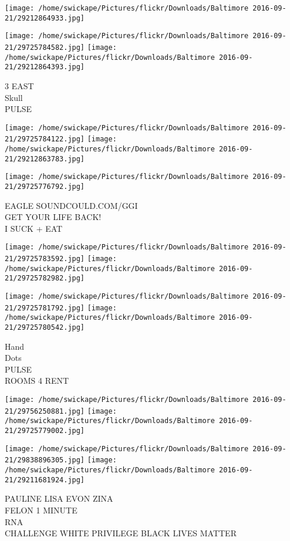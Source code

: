 \documentclass[10pt,letterpaper]{article}
\begin{document}
\texttt{[image: /home/swickape/Pictures/flickr/Downloads/Baltimore 2016-09-21/29212864933.jpg]}

\vspace{0.25in}
\texttt{[image: /home/swickape/Pictures/flickr/Downloads/Baltimore 2016-09-21/29725784582.jpg]}
\texttt{[image: /home/swickape/Pictures/flickr/Downloads/Baltimore 2016-09-21/29212864393.jpg]}

3 EAST\\
Skull\\
PULSE
\pagebreak

\texttt{[image: /home/swickape/Pictures/flickr/Downloads/Baltimore 2016-09-21/29725784122.jpg]}
\texttt{[image: /home/swickape/Pictures/flickr/Downloads/Baltimore 2016-09-21/29212863783.jpg]}

\vspace{0.25in}
\texttt{[image: /home/swickape/Pictures/flickr/Downloads/Baltimore 2016-09-21/29725776792.jpg]}

EAGLE SOUNDCOULD.COM/GGI\\
GET YOUR LIFE BACK!\\
I SUCK + EAT
\pagebreak

\texttt{[image: /home/swickape/Pictures/flickr/Downloads/Baltimore 2016-09-21/29725783592.jpg]}
\texttt{[image: /home/swickape/Pictures/flickr/Downloads/Baltimore 2016-09-21/29725782982.jpg]}

\texttt{[image: /home/swickape/Pictures/flickr/Downloads/Baltimore 2016-09-21/29725781792.jpg]}
\texttt{[image: /home/swickape/Pictures/flickr/Downloads/Baltimore 2016-09-21/29725780542.jpg]}

Hand\\
Dots\\
PULSE\\
ROOMS 4 RENT
\pagebreak

\texttt{[image: /home/swickape/Pictures/flickr/Downloads/Baltimore 2016-09-21/29756250881.jpg]}
\texttt{[image: /home/swickape/Pictures/flickr/Downloads/Baltimore 2016-09-21/29725779002.jpg]}

\texttt{[image: /home/swickape/Pictures/flickr/Downloads/Baltimore 2016-09-21/29838896305.jpg]}
\texttt{[image: /home/swickape/Pictures/flickr/Downloads/Baltimore 2016-09-21/29211681924.jpg]}

PAULINE LISA EVON ZINA\\
FELON 1 MINUTE\\
RNA\\
CHALLENGE WHITE PRIVILEGE BLACK LIVES MATTER
\pagebreak
\end{document}
